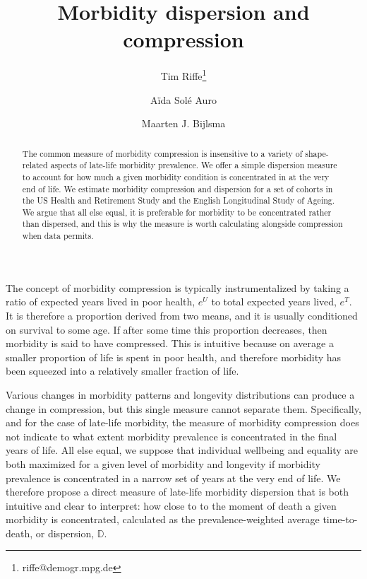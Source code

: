 \documentclass{article}
\begin{document}
\title{Morbidity dispersion and compression}

\author[1]{Tim Riffe\thanks{riffe@demogr.mpg.de}}
\author[2]{A{\"i}da Sol\'{e} Auro}
\author[1]{Maarten J. Bijlsma}

\maketitle

\begin{abstract}
The common measure of morbidity compression is insensitive to a variety of
shape-related aspects of late-life morbidity prevalence. We offer a simple
dispersion measure to account for how much a given morbidity condition is
concentrated in at the very end of life. We estimate morbidity compression and
dispersion for a set of cohorts in the US Health and Retirement Study and the
English Longitudinal Study of Ageing. We argue that all else equal, it is preferable for morbidity to be concentrated rather than dispersed, and this is why the measure is worth calculating alongside compression when data permits.
\end{abstract}

The concept of morbidity compression is typically instrumentalized by taking a
ratio of expected years lived in poor health, $e^U$ to total expected years
lived, $e^T$.
It is therefore a proportion derived from two means, and it is usually conditioned on survival to some age. If after some time this proportion
decreases, then morbidity is said to have compressed. This is intuitive because on average a smaller proportion of life is spent in
poor health, and therefore morbidity has been squeezed into a relatively smaller
fraction of life.

Various changes in morbidity patterns and longevity
distributions can produce a change in compression, but this single
measure cannot separate them. Specifically, and for the case of late-life morbidity, the measure of
morbidity compression does not indicate to what extent morbidity prevalence is
concentrated in the final years of life. All else equal, we suppose that
individual wellbeing and equality are both maximized for a given level of
morbidity and longevity if morbidity prevalence is concentrated in a narrow set of years at the very end of
life.
We therefore propose a direct measure of late-life morbidity dispersion that
is both intuitive and clear to interpret: how close to to the moment of death a given morbidity is
concentrated, calculated as the prevalence-weighted average
time-to-death, or dispersion, $\mathbb{D}$.
\end{document}
